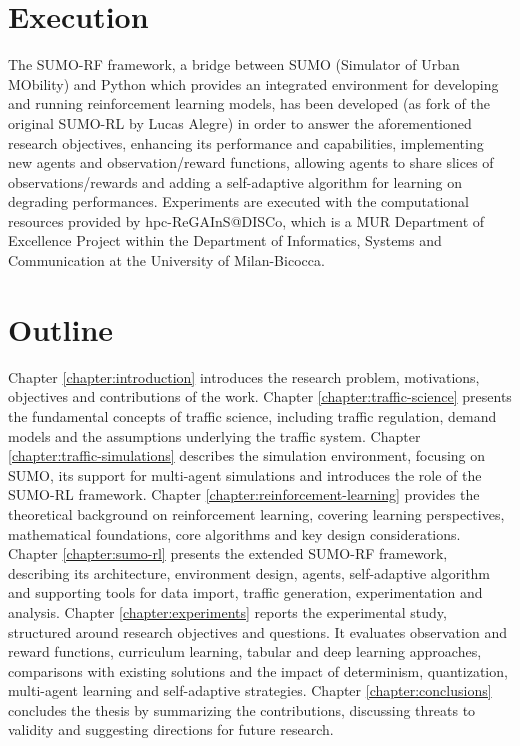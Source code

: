 \section{Execution}

The SUMO-RF framework, a bridge between SUMO (Simulator of Urban MObility) and Python which provides an integrated environment for developing and running reinforcement learning models, has been developed (as fork of the original SUMO-RL by Lucas Alegre) in order to answer the aforementioned research objectives,  enhancing its performance and capabilities, implementing new agents and observation/reward functions, allowing agents to share slices of observations/rewards and adding a self-adaptive algorithm for learning on degrading performances.
Experiments are executed with the computational resources provided by hpc-ReGAInS@DISCo, which is a MUR Department of Excellence Project within the Department of Informatics, Systems and Communication at the University of Milan-Bicocca.

\section{Outline}

Chapter \ref{chapter:introduction} introduces the research problem, motivations, objectives and contributions of the work.
Chapter \ref{chapter:traffic-science} presents the fundamental concepts of traffic science, including traffic regulation, demand models and the assumptions underlying the traffic system.
Chapter \ref{chapter:traffic-simulations} describes the simulation environment, focusing on SUMO, its support for multi-agent simulations and introduces the role of the SUMO-RL framework.
Chapter \ref{chapter:reinforcement-learning} provides the theoretical background on reinforcement learning, covering learning perspectives, mathematical foundations, core algorithms and key design considerations.
Chapter \ref{chapter:sumo-rl} presents the extended SUMO-RF framework, describing its architecture, environment design, agents, self-adaptive algorithm and supporting tools for data import, traffic generation, experimentation and analysis.
Chapter \ref{chapter:experiments} reports the experimental study, structured around research objectives and questions. It evaluates observation and reward functions, curriculum learning, tabular and deep learning approaches, comparisons with existing solutions and the impact of determinism, quantization, multi-agent learning and self-adaptive strategies.
Chapter \ref{chapter:conclusions} concludes the thesis by summarizing the contributions, discussing threats to validity and suggesting directions for future research.
